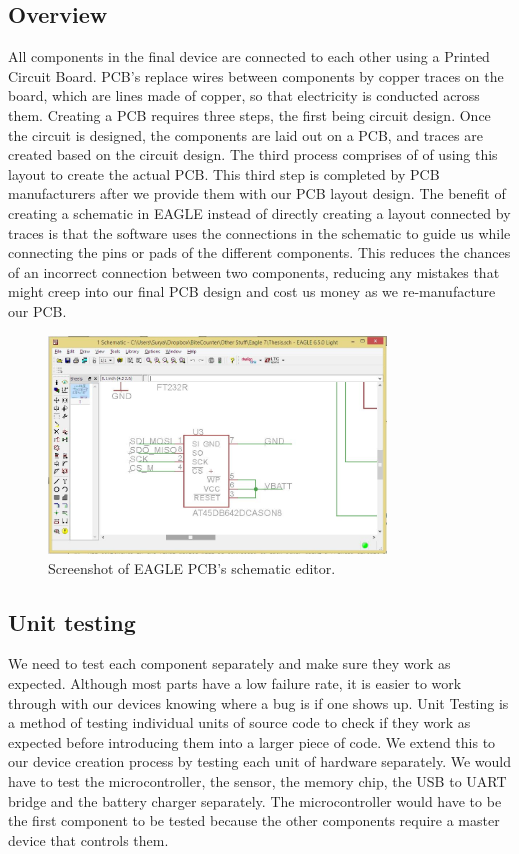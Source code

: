 \subsection{Overview}
\label{Sec:PCBDesign}
All components in the final device are connected to each other using a Printed Circuit Board.
PCB's replace wires between components by copper traces on the board,
which are lines made of copper, so that electricity is conducted across them.
Creating a PCB requires three steps, the first being circuit design.
Once the circuit is designed, the components are laid out on a PCB, and traces are created based on the circuit design.
The third process comprises of of using this layout to create the actual PCB.
This third step is completed by PCB manufacturers after we provide them with our PCB layout design.
The benefit of creating a schematic in EAGLE instead of directly creating a layout connected by traces
is that the software uses the connections in the schematic to guide us while connecting the pins or pads of the different components.
This reduces the chances of an incorrect connection between two components,
reducing any mistakes that might creep into our final PCB design and cost us money as we re-manufacture our PCB.
\begin{figure}
\begin{center}
\includegraphics[width=0.8\textwidth]{images/EagleScreen.jpg}
\caption{Screenshot of EAGLE PCB's schematic editor.}
\label{Fig:EaglePCBScreen}
\end{center}
\end{figure}

\subsection{Unit testing}
\label{Sec:UnitTesting}
We need to test each component separately and make sure they work as expected.
Although most parts have a low failure rate,
it is easier to work through with our devices knowing where a bug is 
if one shows up.
Unit Testing is a method of testing individual units of source code to check if they work as expected before introducing them into a larger piece of code.
We extend this to our device creation process by testing each unit of hardware separately.
We would have to test the microcontroller, the sensor, the memory chip, the USB to UART bridge and the battery charger separately.
The microcontroller would have to be the first component to be tested because the other components require a master device that controls them.

